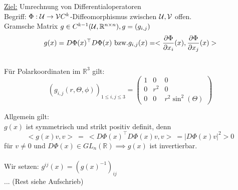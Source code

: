   \begin{remark}
    \underline{Ziel:} Umrechnung von Differentialoperatoren\\
    Begriff: $\Phi: \mathcal{U} \to \mathcal{V} C^k$-Diffeomorphismus zwischen $\mathcal{U}, \mathcal{V}$ offen.\\
    Gramsche Matrix $g \in C^{k-1}(\mathcal{U}, \mathbb{R}^{n\times n}), g = (g_{i,j})$
    $$g(x) = D\Phi(x)^{\top} D\Phi(x) \text{ bzw.}\\
    g_{i,j}(x) = <\frac{\partial\Phi}{\partial x_i}(x), \frac{\partial\Phi}{\partial x_j}(x)>$$\\
    Für Polarkoordinaten im $\mathbb{R}^3$ gilt:
    $$(g_{i,j}(r, \Theta, \phi))_{1\leq i,j \leq 3} = \left(\begin{array}{ccc}
      1 & 0 & 0 \\
      0 & r^2 & 0 \\
      0 & 0 & r^2 \sin^2(\Theta)      
    \end{array}\right)$$
    
    \newpage

    Allgemein gilt:\\
    $g(x)$ ist symmetrisch und strikt positiv definit, denn
    $$<g(x)v,v> \ = \ <D\Phi(x)^{\top}D\Phi(x) v, v> \ = |D\Phi(x) v|^2 > 0$$
    für $v\neq 0$ und $D\Phi(x) \in GL_n(\mathbb{R}) \implies g(x)$ ist invertierbar.\\
    \\
    Wir setzen: $g^{ij}(x) = (g(x)^{-1})_{ij}$\\
    ... (Rest siehe Aufschrieb)
  \end{remark}